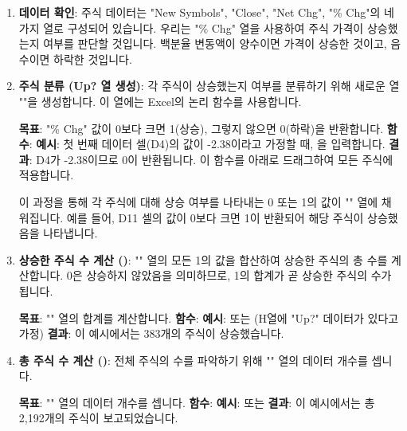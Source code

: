 \documentclass[11pt,a4paper]{article}
\begin{document}
\begin{enumerate}
    \item \textbf{데이터 확인}:
    주식 데이터는 "New Symbols", "Close", "Net Chg", "\% Chg"의 네 가지 열로 구성되어 있습니다. 우리는 "\% Chg" 열을 사용하여 주식 가격이 상승했는지 여부를 판단할 것입니다. 백분율 변동액이 양수이면 가격이 상승한 것이고, 음수이면 하락한 것입니다.

    \item \textbf{주식 분류 (Up? 열 생성)}:
    각 주식이 상승했는지 여부를 분류하기 위해 새로운 열 ""을 생성합니다. 이 열에는 Excel의  논리 함수를 사용합니다.
    \begin{tcolorbox}[title=Excel IF 함수 사용법, mybox]
        \textbf{목표}: "\% Chg" 값이 0보다 크면 1(상승), 그렇지 않으면 0(하락)을 반환합니다.
        \textbf{함수}: 
        \textbf{예시}: 첫 번째 데이터 셀(D4)의 값이 -2.38이라고 가정할 때, 을 입력합니다.
        \textbf{결과}: D4가 -2.38이므로 0이 반환됩니다. 이 함수를 아래로 드래그하여 모든 주식에 적용합니다.
    \end{tcolorbox}
    이 과정을 통해 각 주식에 대해 상승 여부를 나타내는 0 또는 1의 값이 "" 열에 채워집니다. 예를 들어, D11 셀의 값이 0보다 크면 1이 반환되어 해당 주식이 상승했음을 나타냅니다.

    \item \textbf{상승한 주식 수 계산 ()}:
    "" 열의 모든 1의 값을 합산하여 상승한 주식의 총 수를 계산합니다. 0은 상승하지 않았음을 의미하므로, 1의 합계가 곧 상승한 주식의 수가 됩니다.
    \begin{tcolorbox}[title=Excel SUM 함수 사용법, mybox]
        \textbf{목표}: "" 열의 합계를 계산합니다.
        \textbf{함수}: 
        \textbf{예시}:  또는  (H열에 "Up?" 데이터가 있다고 가정)
        \textbf{결과}: 이 예시에서는 383개의 주식이 상승했습니다.
    \end{tcolorbox}

    \item \textbf{총 주식 수 계산 ()}:
    전체 주식의 수를 파악하기 위해 "" 열의 데이터 개수를 셉니다.
    \begin{tcolorbox}[title=Excel COUNT 함수 사용법, mybox]
        \textbf{목표}: "" 열의 데이터 개수를 셉니다.
        \textbf{함수}: 
        \textbf{예시}:  또는 
        \textbf{결과}: 이 예시에서는 총 2,192개의 주식이 보고되었습니다.
    \end{tcolorbox}


\end{enumerate}
\end{document}
